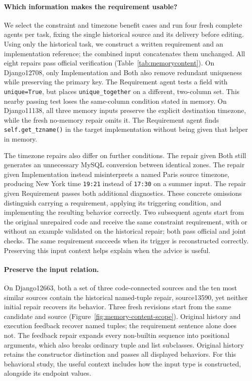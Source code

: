 \paragraph{Which information makes the requirement usable?}
We select the constraint and timezone benefit cases and run four fresh complete agents per task, fixing the single historical source and its delivery before editing.
Using only the historical task, we construct a written requirement and an implementation reference; the combined input concatenates them unchanged.
All eight repairs pass official verification (Table~\ref{tab:memorycontent}).
On Django12708, only Implementation and Both also remove redundant uniqueness while preserving the primary key.
The Requirement agent tests a field with \texttt{unique=True}, but places \texttt{unique\_together} on a different, two-column set.
This nearby passing test loses the same-column condition stated in memory.
On Django11138, all three memory inputs preserve the explicit destination timezone, while the fresh no-memory repair omits it.
The Requirement agent finds \texttt{self.get\_tzname()} in the target implementation without being given that helper in memory.



The timezone repairs also differ on further conditions.
The repair given Both still generates an unnecessary MySQL conversion between identical zones. The repair given Implementation instead misinterprets a named Paris source timezone, producing New York time \texttt{19:21} instead of \texttt{17:30} on a summer input.
The repair given Requirement passes both additional diagnostics.
These concrete omissions distinguish carrying a requirement, applying its triggering condition, and implementing the resulting behavior correctly.
Two subsequent agents start from the original unrepaired code and receive the same constraint requirement, with or without an example validated on the historical repair; both pass official and joint checks.
The same requirement succeeds when its trigger is reconstructed correctly.
Preserving this input context helps explain when the advice is useful.

\paragraph{Preserve the input relation.}
On Django12663, both a set of three code-connected sources and the ten
most similar sources contain the historical named-tuple repair, source13590,
yet neither initial repair recovers its behavior. Three fresh revisions start
from the same candidate and source (Figure~\ref{fig:memory-content-scope}).
Original history and execution feedback recover named tuples; the requirement
sentence alone does not. The feedback repair expands every non-builtin
sequence into positional arguments, which also breaks ordinary tuple and list
subclasses. Original history retains the constructor distinction and passes
all displayed behaviors. For this behavioral study, the useful context includes
how the input type is constructed, alongside its endpoint values.

